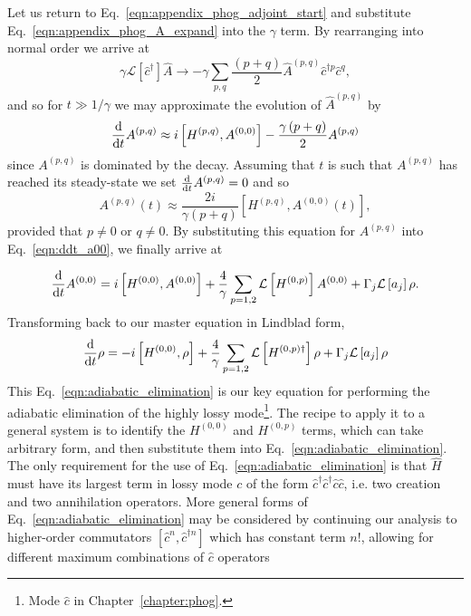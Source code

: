 \noindent Let us return to Eq.~\ref{eqn:appendix_phog_adjoint_start} and substitute Eq.~\ref{eqn:appendix_phog_A_expand} into the $\gamma$ term. By rearranging into normal order we arrive at
\begin{equation}
\gamma \mathcal{L}\left[\hat{c}^\dagger\right] \hat{A} \rightarrow - \gamma \sum_{p, q}\frac{\left(p + q\right)}{2} \hat{A}^{\left(p, q\right)} \hat{c}^{\dagger p} \hat{c}^q,
\end{equation} %
and so for $t \gg 1/\gamma$ we may approximate the evolution of $\hat{A}^{\left(p, q\right)}$ by
\begin{equation}
\frac{\mathrm{d}}{\mathrm{d}t} A^{\left(p, q\right)} \approx i \left[ H^{\left(p, q\right)}, A^{\left(0, 0\right)}\right] - \frac{\gamma \left(p + q\right)}{2} A^{\left(p, q\right)}
\end{equation}
since $A^{\left(p, q\right)}$ is dominated by the decay. Assuming that $t$ is such that $A^{\left(p, q\right)}$ has reached its steady-state we set $\frac{\mathrm{d}}{\mathrm{d}t} A^{\left(p, q\right)} = 0$ and so
\begin{equation}
A^{\left(p, q\right)} \left(t\right) \approx \frac{2 i}{\gamma \left(p + q\right)} \left[H^{\left(p, q\right)}, A^{\left(0, 0\right)}\left(t\right)\right],
\end{equation}
provided that $p \ne 0$ or $q \ne 0$. By substituting this equation for $A^{\left(p, q\right)}$ into Eq.~\ref{eqn:ddt_a00}, we finally arrive at

\begin{equation}
\ddt A^{\left(0, 0\right)} = i \left[ H^{\left(0, 0\right)}, A^{\left(0, 0\right)}\right] + \frac{4}{\gamma} \sum_{p = {1, 2}} \mathcal{L}\left[ H^{\left(0, p\right)} \right] A^{\left(0, 0\right)} + \Gamma_j \mathcal{L}\left[a_j\right] \rho. %
\end{equation}
Transforming back to our master equation in Lindblad form,
\begin{equation}\label{eqn:adiabatic_elimination}
\frac{\mathrm{d}}{\mathrm{d}t} \rho = - i \left[ H^{\left(0, 0\right)}, \rho\right] + \frac{4}{\gamma} \sum_{p = 1, 2} \mathcal{L} \left[H^{\left(0, p\right)\dagger}\right] \rho + \Gamma_j \mathcal{L}\left[a_j\right] \rho
\end{equation}
This Eq.~\ref{eqn:adiabatic_elimination} is our key equation for performing the adiabatic elimination of the highly lossy mode\footnote{Mode $\hat{c}$ in Chapter~\ref{chapter:phog}.}. The recipe to apply it to a general system is to identify the $H^{\left(0, 0\right)}$ and $H^{\left(0, p\right)}$ terms, which can take arbitrary form, and then substitute them into Eq.~\ref{eqn:adiabatic_elimination}. The only requirement for the use of Eq.~\ref{eqn:adiabatic_elimination} is that $\hat{H}$ must have its largest term in lossy mode $c$ of the form $\hat{c}^\dagger \hat{c}^\dagger \hat{c} \hat{c}$, i.e. two creation and two annihilation operators. More general forms of Eq.~\ref{eqn:adiabatic_elimination} may be considered by continuing our analysis to higher-order commutators $\left[ \hat{c}^n, \hat{c}^{\dagger n}\right]$ which has constant term $n!$, allowing for different maximum combinations of $\hat{c}$ operators 


